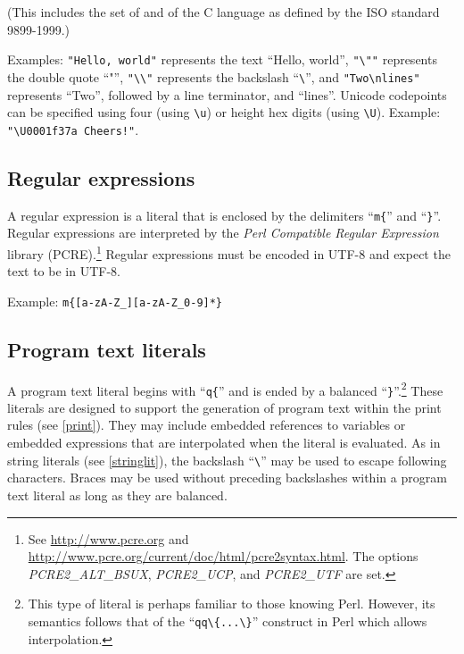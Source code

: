 \bigskip

\noindent
(This includes the set of  and
 of the C language as defined
by the ISO standard 9899-1999.)

Examples: \lstinline!"Hello, world"! represents the text ``Hello, world'',
\lstinline!"\""! represents the double quote ``"'',
\lstinline!"\\"! represents the backslash ``\lstinline!\!'',
and \lstinline!"Two\nlines"! represents ``Two'', followed by
a line terminator, and ``lines''. Unicode codepoints can be
specified using four (using \lstinline!\u!) or height hex digits
(using \lstinline!\U!). Example: \lstinline^"\U0001f37a Cheers!"^.

\subsection{Regular expressions}\label{regexlit}

A regular expression is a literal that is enclosed by the
delimiters ``\lstinline!m{!'' and ``\lstinline!}!''. Regular
expressions are interpreted by the \textit{Perl Compatible
Regular Expression} library (PCRE).\footnote{See
\url{http://www.pcre.org} and
\url{http://www.pcre.org/current/doc/html/pcre2syntax.html}. The
options \textit{PCRE2\_ALT\_BSUX}, \textit{PCRE2\_UCP},
and \textit{PCRE2\_UTF} are set.} Regular expressions
must be encoded in UTF-8 and expect the text to be in UTF-8.

Example: \lstinline!m{[a-zA-Z_][a-zA-Z_0-9]*}!

\subsection{Program text literals}
\label{textlit}

A program text literal begins with ``\lstinline!q{!'' and is ended
by a balanced ``\lstinline!}!''.\footnote{This type of literal is
perhaps familiar to those knowing Perl. However, its semantics follows
that of the ``\lstinline!qq\{...\}!'' construct in Perl which allows
interpolation.} These literals are designed to support the generation of
program text within the print rules (see \ref{print}).
They may include embedded references to variables or embedded
expressions that are interpolated when the literal is evaluated. As in
string literals (see \ref{stringlit}), the backslash ``\lstinline!\!''
may be used to escape following characters. Braces may be used without
preceding backslashes within a program text literal as long as they are
balanced.

